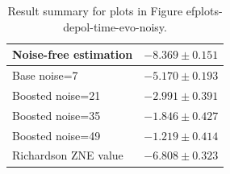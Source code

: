 \begin{table}
\caption{Result summary for plots in Figure 
ef{plots-depol-time-evo-noisy}.}
\begin{tabular*}{\textwidth}{@{\extracolsep{\fill}}ll@{}}
\toprule

Noise-free estimation & $-8.369 \pm 0.151$ \\
\midrule
Base noise=7 & $-5.170 \pm 0.193$ \\
Boosted noise=21 & $-2.991 \pm 0.391$ \\
Boosted noise=35 & $-1.846 \pm 0.427$ \\
Boosted noise=49 & $-1.219 \pm 0.414$ \\
\midrule
Richardson ZNE value & $-6.808 \pm 0.323$ \\
\bottomrule
\end{tabular*}
\label{table-dephasing-time-evo-noisy}
\end{table}
